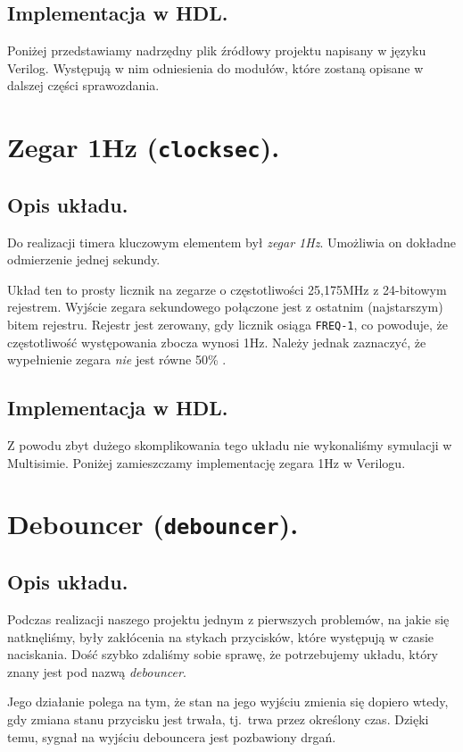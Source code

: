\documentclass[a4paper,oneside]{report}
\newcommand{\clocksec}{\texttt{clock\textunderscore sec}}
\newcommand{\debouncer}{\texttt{debouncer}}
\begin{document}
\subsection{Implementacja w HDL.}
Poniżej przedstawiamy nadrzędny plik źródłowy projektu napisany w
języku Verilog. Występują w nim odniesienia do modułów, które
zostaną opisane w dalszej części sprawozdania.


\section{Zegar 1Hz (\clocksec).}
\subsection{Opis układu.}
Do realizacji timera kluczowym elementem był \emph{zegar 1Hz}.
Umożliwia on dokładne odmierzenie jednej sekundy.

Układ ten to prosty licznik na zegarze o częstotliwości 25,175MHz
z 24-bitowym rejestrem. Wyjście zegara sekundowego połączone
jest z ostatnim (najstarszym) bitem rejestru. Rejestr jest
zerowany, gdy licznik osiąga \texttt{FREQ-1}, co powoduje, że
częstotliwość występowania zbocza wynosi 1Hz. Należy jednak
zaznaczyć, że wypełnienie zegara \emph{nie} jest równe 50\% .
\subsection{Implementacja w HDL.}
Z powodu zbyt dużego skomplikowania tego układu nie wykonaliśmy
symulacji w Multisimie. Poniżej zamieszczamy implementację zegara
1Hz w Verilogu.


\section{Debouncer (\debouncer).}
\subsection{Opis układu.}
Podczas realizacji naszego projektu jednym z pierwszych problemów,
na jakie się natknęliśmy, były zakłócenia na stykach przycisków,
które występują w czasie naciskania. Dość szybko zdaliśmy sobie
sprawę, że potrzebujemy układu, który znany jest pod nazwą
\emph{debouncer}.

Jego działanie polega na tym, że stan na jego wyjściu zmienia się
dopiero wtedy, gdy zmiana stanu przycisku jest trwała, tj.\
trwa przez określony czas. Dzięki temu, sygnał na wyjściu
debouncera jest pozbawiony drgań.
\end{document}
